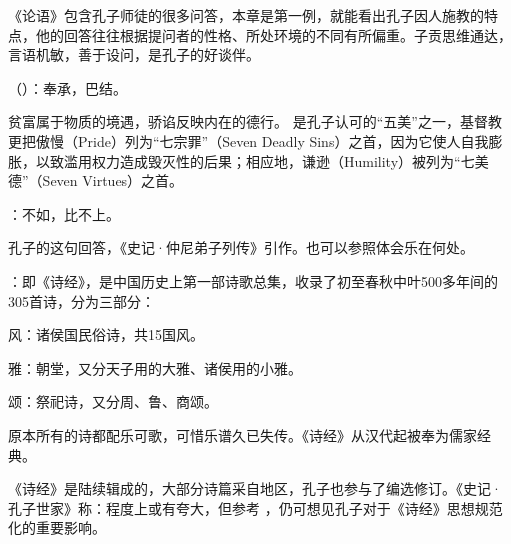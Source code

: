 {
《论语》包含孔子师徒的很多问答，本章是第一例，就能看出孔子因人施教的特点，他的回答往往根据提问者的性格、所处环境的不同有所偏重。子贡思维通达，言语机敏，善于设问，是孔子的好谈伴。
\begin{lyblobitemize}
\item {}（）：奉承，巴结。

贫富属于物质的境遇，骄谄反映内在的德行。 是孔子认可的“五美”之一，基督教更把傲慢（Pride）列为“七宗罪”（Seven Deadly Sins）之首，因为它使人自我膨胀，以致滥用权力造成毁灭性的后果；相应地，谦逊（Humility）被列为“七美德”（Seven Virtues）之首。

\item {}：不如，比不上。

孔子的这句回答，《史记·仲尼弟子列传》引作。也可以参照体会乐在何处。

\item {}：即《诗经》，是中国历史上第一部诗歌总集，收录了初至春秋中叶500多年间的305首诗，分为三部分：
\begin{lyitemize}
\item 风：诸侯国民俗诗，共15国风。
\item 雅：朝堂，又分天子用的大雅、诸侯用的小雅。
\item 颂：祭祀诗，又分周、鲁、商颂。
\end{lyitemize}
原本所有的诗都配乐可歌，可惜乐谱久已失传。《诗经》从汉代起被奉为儒家经典。

《诗经》是陆续辑成的，大部分诗篇采自地区，孔子也参与了编选修订。《史记·孔子世家》称：程度上或有夸大，但参考 ，仍可想见孔子对于《诗经》思想规范化的重要影响。


\end{lyblobitemize}}
